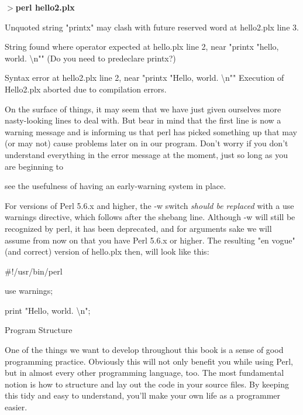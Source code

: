 \documentclass[a4paper,11pt]{book}
\begin{document}
\noindent 

\noindent \textbf{$>$perl hello2.plx}

\noindent 

\noindent Unquoted string "printx" may clash with future reserved word at hello2.plx line 3.

\noindent String found where operator expected at hello.plx line 2, near "printx "hello, world. \textbackslash n"" (Do you need to predeclare printx?)

\noindent Syntax error at hello2.plx line 2, near "printx "Hello, world. \textbackslash n"" Execution of Hello2.plx aborted due to compilation errors.

\noindent 

\noindent On the surface of things, it may seem that we have just given ourselves more nasty-looking lines to deal with. But bear in mind that the first line is now a warning  message and is informing us that perl has picked something up that may (or may not) cause problems later on in our program. Don't worry if you don't understand everything in the error message at the moment, just so long as you are beginning to

\noindent see the usefulness of having an early-warning system in place.

\noindent 

\noindent For versions of Perl 5.6.x and higher, the -w switch \textit{should be replaced }with a use warnings directive, which follows after the shebang line. Although -w will still be recognized by perl, it has been deprecated, and for arguments sake we will assume from now on that you have Perl 5.6.x or higher. The resulting "en vogue" (and correct) version of hello.plx then, will look like this:

\noindent 

\noindent \#!/usr/bin/perl

\noindent use warnings;

\noindent 

\noindent print "Hello, world. \textbackslash n";

\noindent 

\noindent Program Structure

\noindent 

\noindent One of the things we want to develop throughout this book is a sense of good programming practice. Obviously this will not only benefit you while using Perl, but in almost every other programming language, too. The most fundamental notion is how to structure and lay out the code in your source files. By keeping this tidy and easy to understand, you'll make your own life as a programmer easier.
\end{document}
